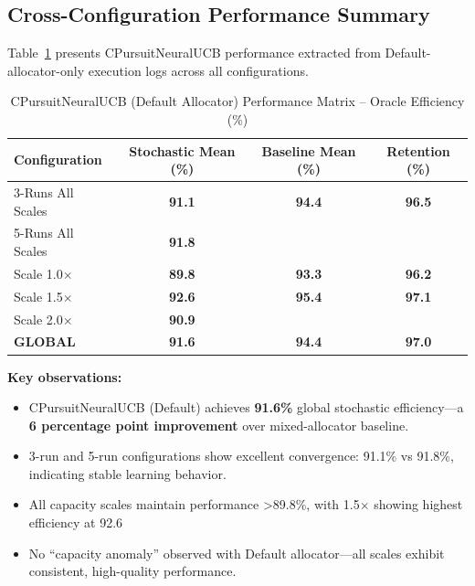 \documentclass[12pt,a4paper]{article}
\newcommand{\success}[1]{\textcolor{accentgreen}{\textbf{#1}}}
\begin{document}
\begin{tcolorbox}[colback=tableheader,colframe=primaryblue,title=\textbf{Primary Performance Results (Default Allocator Only, Log-Extracted)}]

\subsection{Cross-Configuration Performance Summary}

Table~\ref{tab:cpursuit_performance_default} presents CPursuitNeuralUCB performance extracted from Default-allocator-only execution logs across all configurations.

\begin{table}[H]
\centering
\caption{CPursuitNeuralUCB (Default Allocator) Performance Matrix -- Oracle Efficiency (\%)}
\label{tab:cpursuit_performance_default}
\begin{tabular}{@{}lccc@{}}
\toprule
\textbf{Configuration} & \textbf{Stochastic Mean (\%)} & \textbf{Baseline Mean (\%)} & \textbf{Retention (\%)} \\
\midrule
3-Runs All Scales       & \success{91.1}  & \success{94.4}  & \success{96.5} \\
5-Runs All Scales       & \success{91.8}  & \text{---}      & \text{---} \\
\midrule
Scale 1.0$\times$       & \success{89.8}  & \success{93.3}  & \success{96.2} \\
Scale 1.5$\times$       & \success{92.6}  & \success{95.4}  & \success{97.1} \\
Scale 2.0$\times$       & \success{90.9}  & \text{---}      & \text{---} \\
\midrule
\textbf{GLOBAL}         & \textbf{\success{91.6}}  & \textbf{\success{94.4}}  & \textbf{\success{97.0}} \\
\bottomrule
\end{tabular}
\end{table}

\textbf{Key observations:}

\begin{itemize}
    \item CPursuitNeuralUCB (Default) achieves \success{91.6\%} global stochastic efficiency---a \success{6 percentage point improvement} over mixed-allocator baseline.
    
    \item 3-run and 5-run configurations show excellent convergence: 91.1\% vs 91.8\%, indicating stable learning behavior.
    
    \item All capacity scales maintain performance >89.8\%, with 1.5$\times$ showing highest efficiency at 92.6%
    
    \item No ``capacity anomaly'' observed with Default allocator---all scales exhibit consistent, high-quality performance.
\end{itemize}

\end{tcolorbox}
\end{document}
